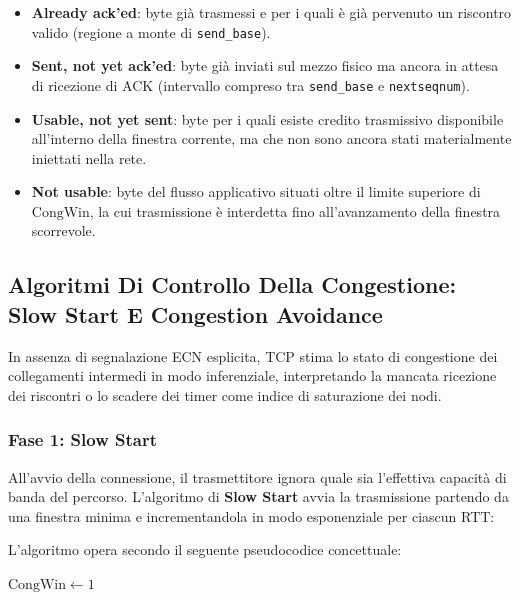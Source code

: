 \documentclass[11pt, a4paper]{article}
\begin{document}
\begin{itemize}[noitemsep]
    \item \textbf{Already ack'ed}: byte già trasmessi e per i quali è già pervenuto un riscontro valido (regione a monte di \texttt{send\_base}).
    \item \textbf{Sent, not yet ack'ed}: byte già inviati sul mezzo fisico ma ancora in attesa di ricezione di ACK (intervallo compreso tra \texttt{send\_base} e \texttt{nextseqnum}).
    \item \textbf{Usable, not yet sent}: byte per i quali esiste credito trasmissivo disponibile all'interno della finestra corrente, ma che non sono ancora stati materialmente iniettati nella rete.
    \item \textbf{Not usable}: byte del flusso applicativo situati oltre il limite superiore di $\text{CongWin}$, la cui trasmissione è interdetta fino all'avanzamento della finestra scorrevole.
\end{itemize}

\subsection{Algoritmi Di Controllo Della Congestione: Slow Start E Congestion Avoidance}

In assenza di segnalazione ECN esplicita, TCP stima lo stato di congestione dei collegamenti intermedi in modo inferenziale, interpretando la mancata ricezione dei riscontri o lo scadere dei timer come indice di saturazione dei nodi.

\subsubsection{Fase 1: Slow Start}
All'avvio della connessione, il trasmettitore ignora quale sia l'effettiva capacità di banda del percorso. L'algoritmo di \textbf{Slow Start} avvia la trasmissione partendo da una finestra minima e incrementandola in modo esponenziale per ciascun RTT:


L'algoritmo opera secondo il seguente pseudocodice concettuale:

\begin{algorithm}[H]
\caption{Algoritmo Di TCP Slow Start}
$\text{CongWin} \gets 1$\;
\end{algorithm}
\end{document}

